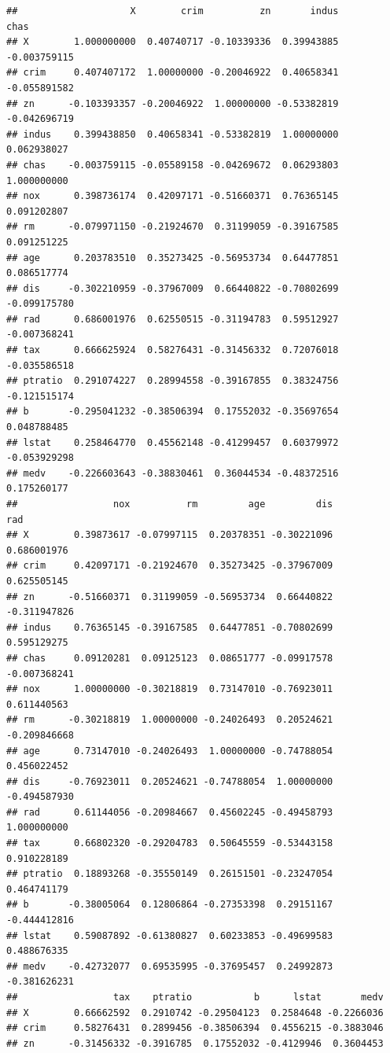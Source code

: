 \documentclass[]{ctexbook}
\begin{document}
\begin{lstlisting}
##                    X        crim          zn       indus         chas
## X        1.000000000  0.40740717 -0.10339336  0.39943885 -0.003759115
## crim     0.407407172  1.00000000 -0.20046922  0.40658341 -0.055891582
## zn      -0.103393357 -0.20046922  1.00000000 -0.53382819 -0.042696719
## indus    0.399438850  0.40658341 -0.53382819  1.00000000  0.062938027
## chas    -0.003759115 -0.05589158 -0.04269672  0.06293803  1.000000000
## nox      0.398736174  0.42097171 -0.51660371  0.76365145  0.091202807
## rm      -0.079971150 -0.21924670  0.31199059 -0.39167585  0.091251225
## age      0.203783510  0.35273425 -0.56953734  0.64477851  0.086517774
## dis     -0.302210959 -0.37967009  0.66440822 -0.70802699 -0.099175780
## rad      0.686001976  0.62550515 -0.31194783  0.59512927 -0.007368241
## tax      0.666625924  0.58276431 -0.31456332  0.72076018 -0.035586518
## ptratio  0.291074227  0.28994558 -0.39167855  0.38324756 -0.121515174
## b       -0.295041232 -0.38506394  0.17552032 -0.35697654  0.048788485
## lstat    0.258464770  0.45562148 -0.41299457  0.60379972 -0.053929298
## medv    -0.226603643 -0.38830461  0.36044534 -0.48372516  0.175260177
##                 nox          rm         age         dis          rad
## X        0.39873617 -0.07997115  0.20378351 -0.30221096  0.686001976
## crim     0.42097171 -0.21924670  0.35273425 -0.37967009  0.625505145
## zn      -0.51660371  0.31199059 -0.56953734  0.66440822 -0.311947826
## indus    0.76365145 -0.39167585  0.64477851 -0.70802699  0.595129275
## chas     0.09120281  0.09125123  0.08651777 -0.09917578 -0.007368241
## nox      1.00000000 -0.30218819  0.73147010 -0.76923011  0.611440563
## rm      -0.30218819  1.00000000 -0.24026493  0.20524621 -0.209846668
## age      0.73147010 -0.24026493  1.00000000 -0.74788054  0.456022452
## dis     -0.76923011  0.20524621 -0.74788054  1.00000000 -0.494587930
## rad      0.61144056 -0.20984667  0.45602245 -0.49458793  1.000000000
## tax      0.66802320 -0.29204783  0.50645559 -0.53443158  0.910228189
## ptratio  0.18893268 -0.35550149  0.26151501 -0.23247054  0.464741179
## b       -0.38005064  0.12806864 -0.27353398  0.29151167 -0.444412816
## lstat    0.59087892 -0.61380827  0.60233853 -0.49699583  0.488676335
## medv    -0.42732077  0.69535995 -0.37695457  0.24992873 -0.381626231
##                 tax    ptratio           b      lstat       medv
## X        0.66662592  0.2910742 -0.29504123  0.2584648 -0.2266036
## crim     0.58276431  0.2899456 -0.38506394  0.4556215 -0.3883046
## zn      -0.31456332 -0.3916785  0.17552032 -0.4129946  0.3604453

\end{lstlisting}
\end{document}
